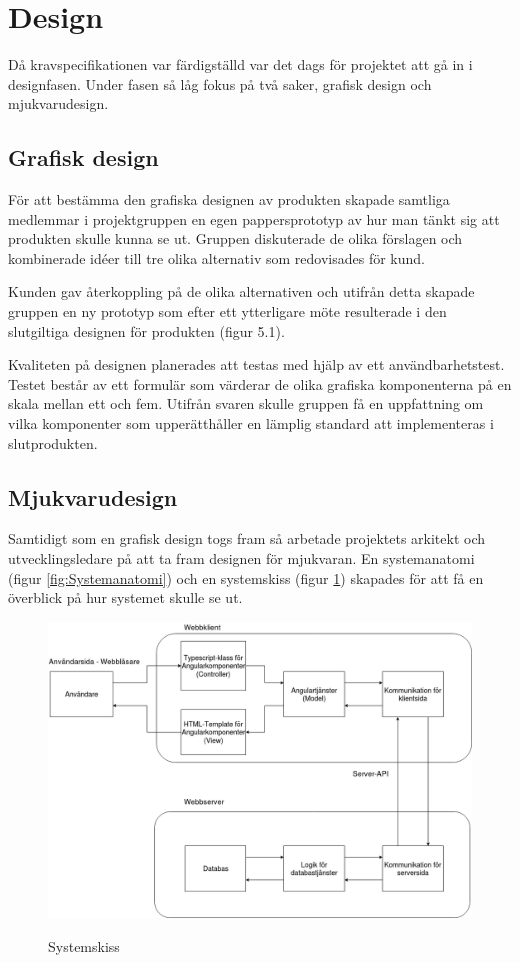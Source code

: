 \section{Design}
Då kravspecifikationen var färdigställd var det dags för projektet att gå in i designfasen. Under fasen så låg fokus på två saker, grafisk design och mjukvarudesign.

\subsection{Grafisk design}\label{sec:grafisk_design}
För att bestämma den grafiska designen av produkten skapade samtliga medlemmar i projektgruppen en egen pappersprototyp av hur man tänkt sig att produkten skulle kunna se ut. Gruppen diskuterade de olika förslagen och kombinerade idéer till tre olika alternativ som redovisades för kund.

Kunden gav återkoppling på de olika alternativen och utifrån detta skapade gruppen en ny prototyp som efter ett ytterligare möte resulterade i den slutgiltiga designen för produkten (figur 5.1).

Kvaliteten på designen planerades att testas med hjälp av ett användbarhetstest. Testet består av ett formulär som värderar de olika grafiska komponenterna på en skala mellan ett och fem. Utifrån svaren skulle gruppen få en uppfattning om vilka komponenter som upperätthåller en lämplig standard att implementeras i slutprodukten. 

\subsection{Mjukvarudesign}
Samtidigt som en grafisk design togs fram så arbetade projektets arkitekt och utvecklingsledare på att ta fram designen för mjukvaran. En systemanatomi (figur \ref{fig:Systemanatomi}) och en systemskiss (figur \ref{fig:Systemskiss}) skapades för att få en överblick på hur systemet skulle se ut. 


\begin{figure}[H]
    \includegraphics[width=\textwidth,height=.4\textheight]{Figures/Systemskiss.png}\\
    \caption{Systemskiss}
    \label{fig:Systemskiss}
\end{figure}

